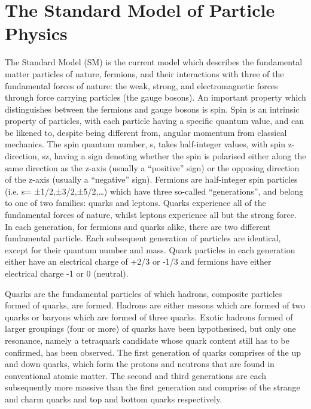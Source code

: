 \section{The Standard Model of Particle Physics}\label{sec:sm}

The Standard Model (SM) is the current model which describes the fundamental matter particles of nature, fermions, and their interactions with three of the fundamental forces of nature: the weak, strong, and electromagnetic forces through force carrying particles (the gauge bosons). 
An important property which distinguishes between the fermions and gauge bosons is spin. 
Spin is an intrinsic property of particles, with each particle having a specific quantum value, and can be likened to, despite being different from, angular momentum from classical mechanics. 
The spin quantum number, s,  takes half-integer values, with spin z-direction, sz, having a sign denoting whether the spin is polarised either along the same direction as the z-axis (usually a “positive” sign) or the opposing direction of the z-axis (usually a “negative” sign). 
Fermions are half-integer spin particles (i.e. s= ±1/2,±3/2,±5/2,…) which have three so-called “generations”, and belong to one of two families: quarks and leptons. 
Quarks experience all of the fundamental forces of nature, whilst leptons experience all but the strong force. 
In each generation, for fermions and quarks alike, there are two different fundamental particle. 
Each subsequent generation of particles are identical, except for their quantum number and mass. 
Quark particles in each generation either have an electrical charge of +2/3 or -1/3 and fermions have either electrical charge -1 or 0 (neutral). 

Quarks are the fundamental particles of which hadrons, composite particles formed of quarks, are formed. 
Hadrons are either mesons which are formed of two quarks or baryons which are formed of three quarks. 
Exotic hadrons formed of larger groupings (four or more) of quarks have been hypothesised, but only one resonance, namely a tetraquark candidate whose quark content still has to be confirmed, has been observed. 
The first generation of quarks comprises of the up and down quarks, which form the protons and neutrons that are found in conventional atomic matter. 
The second and third generations are each subsequently more massive than the first generation and comprise of the strange and charm quarks and top and bottom quarks respectively. 

